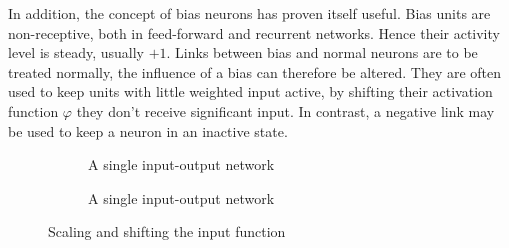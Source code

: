 \documentclass[10pt,a4paper,DIV=11]{scrreprt}
\begin{document}
In addition, the concept of bias neurons has proven itself useful. Bias units are non-receptive, both in feed-forward and recurrent networks. 
Hence their activity level is steady, usually $+1$. Links between bias and normal neurons are to be treated normally, the influence of a bias can 
therefore be altered. They are often used to keep units with little weighted input active, by shifting their activation function $\varphi$ they 
don't receive significant input. In contrast, a negative link may be used to keep a neuron in an inactive state.

\begin{figure}[H]

\centering
\begin{subfigure}{.5\textwidth}
  \centering
  \caption{A single input-output network}
  \label{fig:1on1}
\end{subfigure}%
\begin{subfigure}{.5\textwidth}
    \centering
    \caption{A single input-output network}
    \label{fig:2on1}
\end{subfigure}
\newline
\caption{Scaling and shifting the input function}
\label{fig:networks}
\end{figure}
\end{document}
